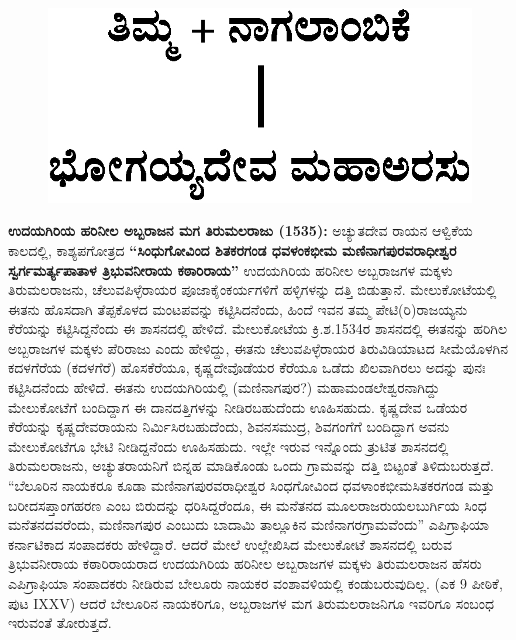 \vskip -1pt

\begin{figure}[H]
\includegraphics[scale=1]{images/chap3/chap3fig39.jpeg}
\end{figure}

\textbf{ಉದಯಗಿರಿಯ ಹರಿನೀಲ ಅಬ್ಬರಾಜನ ಮಗ ತಿರುಮಲರಾಜು (1535):} ಅಚ್ಯುತದೇವ ರಾಯನ ಆಳ್ವಿಕೆಯ ಕಾಲದಲ್ಲಿ, ಕಾಶ್ಯಪಗೋತ್ರದ \textbf{“ಸಿಂಧುಗೋವಿಂದ ಶಿತಕರಗಂಡ ಧವಳಂಕಭೀಮ ಮಣಿನಾಗಪುರವರಾಧೀಶ್ವರ ಸ್ವರ್ಗಮರ್ತ್ಯ\-ಪಾತಾಳ ತ್ರಿಭುವನೀರಾಯ ಕಠಾರಿರಾಯ”} ಉದಯಗಿರಿಯ ಹರಿನೀಲ ಅಬ್ಬರಾಜಗಳ ಮಕ್ಕಳು ತಿರುಮಲರಾಜನು, ಚೆಲುವ\-ಪಿಳ್ಳೆರಾಯರ ಪೂಜಾಕೈಂಕರ್ಯಗಳಿಗೆ ಹಳ್ಳಿಗಳನ್ನು ದತ್ತಿ ಬಿಡುತ್ತಾನೆ. ಮೇಲುಕೋಟೆಯಲ್ಲಿ ಈತನು ಹೊಸದಾಗಿ ತೆಪ್ಪಕೊಳದ ಮಂಟಪವನ್ನು ಕಟ್ಟಿಸಿದನೆಂದು, ಹಿಂದೆ ಇವನ ತಮ್ಮ ಪೇಟಿ(ರಿ)ರಾಜಯ್ಯನು ಕೆರೆಯನ್ನು ಕಟ್ಟಿಸಿದ್ದನೆಂದು ಈ ಶಾಸನದಲ್ಲಿ ಹೇಳಿದೆ. ಮೇಲುಕೋಟೆಯ ಕ್ರಿ.ಶ.1534ರ ಶಾಸನದಲ್ಲಿ ಈತನನ್ನು ಹರಿಗಿಲ ಅಬ್ಬರಾಜಗಳ ಮಕ್ಕಳು ಪೆರಿರಾಜು ಎಂದು ಹೇಳಿದ್ದು, ಈತನು ಚೆಲುವಪಿಳ್ಳೆರಾಯರ ತಿರುವಿಡಿಯಾಟದ ಸೀಮೆಯೊಳಗಿನ ಕದಳಗೆರೆಯ (ಕದಳಗೆರೆ) ಹೊಸಕೆರೆಯೂ, ಕೃಷ್ಣದೇವೊಡೆಯರ ಕೆರೆಯೂ ಒಡೆದು ಖಿಲವಾಗಿರಲು ಅದನ್ನು ಪುನಃ ಕಟ್ಟಿಸಿದನೆಂದು ಹೇಳಿದೆ. ಈತನು ಉದಯಗಿರಿಯಲ್ಲಿ (ಮಣಿನಾಗಪುರ?) ಮಹಾಮಂಡಲೇಶ್ವರನಾಗಿದ್ದು ಮೇಲುಕೋಟೆಗೆ ಬಂದಿದ್ದಾಗ ಈ ದಾನದತ್ತಿಗಳನ್ನು ನೀಡಿರಬಹುದೆಂದು ಊಹಿಸಹುದು. ಕೃಷ್ಣದೇವ ಒಡೆಯರ ಕೆರೆಯನ್ನು ಕೃಷ್ಣದೇವರಾಯನು ನಿರ್ಮಿಸಿರಬಹುದೆಂದು, ಶಿವನಸಮುದ್ರ, ಶಿವಗಂಗೆಗೆ ಬಂದಿದ್ದಾಗ ಅವನು ಮೇಲುಕೋಟೆಗೂ ಭೇಟಿ ನೀಡಿದ್ದನೆಂದು ಊಹಿಸಹುದು. ಇಲ್ಲೇ ಇರುವ ಇನ್ನೊಂದು ತ್ರುಟಿತ ಶಾಸನದಲ್ಲಿ ತಿರುಮಲರಾಜನು, ಅಚ್ಯುತರಾಯನಿಗೆ ಬಿನ್ನಹ ಮಾಡಿಕೊಂಡು ಒಂದು ಗ್ರಾಮವನ್ನು ದತ್ತಿ ಬಿಟ್ಟಂತೆ ತಿಳಿದುಬರುತ್ತದೆ. “ಬೆಲೂರಿನ ನಾಯಕರೂ ಕೂಡಾ ಮಣಿನಾಗಪುರವರಾಧೀಶ್ವರ ಸಿಂಧಗೋವಿಂದ ಧವಳಾಂಕಭೀಮ\break ಸಿತಕರಗಂಡ ಮತ್ತು ಬರೀದಸಪ್ತಾಂಗಹರಣ ಎಂಬ ಬಿರುದನ್ನು ಧರಿಸಿದ್ದರೆಂದೂ, ಈ ಮನೆತನದ ಮೂಲರಾಜರು\break ಯಲಬುರ್ಗಿಯ ಸಿಂಧ ಮನೆತನದವರೆಂದು, ಮಣಿನಾಗಪುರ ಎಂಬುದು ಬಾದಾಮಿ ತಾಲ್ಲೂಕಿನ ಮಣಿನಾಗರಗ್ರಾಮವೆಂದು” ಎಪಿಗ್ರಾಫಿಯಾ ಕರ್ನಾಟಿಕಾದ ಸಂಪಾದಕರು ಹೇಳಿದ್ದಾರೆ. ಆದರೆ ಮೇಲೆ ಉಲ್ಲೇಖಿಸಿದ ಮೇಲುಕೋಟೆ ಶಾಸನದಲ್ಲಿ ಬರುವ ತ್ರಿಭುವನೀರಾಯ ಕಠಾರಿರಾಯರಾದ ಉದಯಗಿರಿಯ ಹರಿನೀಲ ಅಬ್ಬರಾಜಗಳ ಮಕ್ಕಳು ತಿರುಮಲರಾಜನ ಹೆಸರು ಎಪಿಗ್ರಾಫಿಯಾ ಸಂಪಾದಕರು ನೀಡಿರುವ ಬೇಲೂರು ನಾಯಕರ ವಂಶಾವಳಿ\-ಯಲ್ಲಿ ಕಂಡುಬರುವುದಿಲ್ಲ. (ಎಕ 9 ಪೀಠಿಕೆ, ಪುಟ IXXV) ಆದರೆ ಬೇಲೂರಿನ ನಾಯಕರಿಗೂ, ಅಬ್ಬರಾಜಗಳ ಮಗ ತಿರುಮಲರಾಜನಿಗೂ ಇವರಿಗೂ ಸಂಬಂಧ ಇರುವಂತೆ ತೋರುತ್ತದೆ.


